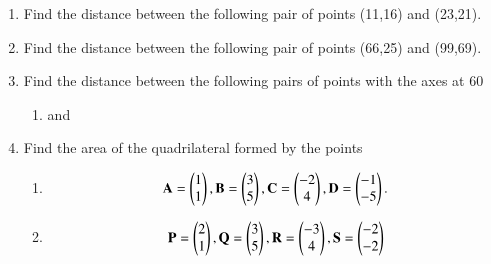 \renewcommand{\theequation}{\theenumi}
\renewcommand{\thefigure}{\theenumi}
\begin{enumerate}[label=\thesubsection.\arabic*.,ref=\thesubsection.\theenumi]

\item Find the distance between the following pair of points
(11,16) and (23,21).\\


\item Find the distance between the following pair of points
(66,25) and (99,69).
\\

%
\item Find the distance between the following pairs of points  with the axes at 60\degree
\begin{enumerate}
    \item {} and 
    \solution
    
\end{enumerate}
\item Find the area of the quadrilateral formed by the points
\begin{enumerate}
\item 
\begin{align}
\begin{split}
\mathbf{A} = \begin{pmatrix}1 \\ 1\end{pmatrix}, 
\mathbf{B} = \begin{pmatrix}3 \\ 5\end{pmatrix}, 
\mathbf{C} = \begin{pmatrix}-2 \\ 4\end{pmatrix}, 
\mathbf{D} = \begin{pmatrix}-1 \\ -5\end{pmatrix}.
\end{split}
\end{align}
\solution

\item 
\begin{align}
\mathbf{P} = \begin{pmatrix}2\\1\end{pmatrix}, \mathbf{Q} =\begin{pmatrix}3\\5\end{pmatrix},
\mathbf{R} =\begin{pmatrix}-3\\4\end{pmatrix}, \mathbf{S} =\begin{pmatrix}-2\\-2\end{pmatrix}
\end{align}
\solution


\end{enumerate}
\end{enumerate}
